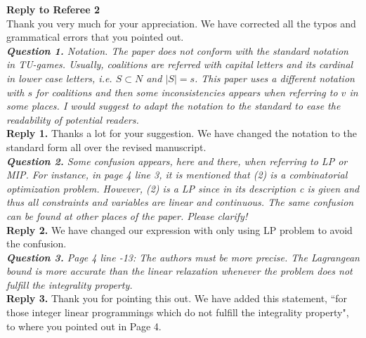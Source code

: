\documentclass[11pt]{article}
\begin{document}
\noindent \textbf{\large Reply to Referee 2}
\\[3mm]
Thank you very much for your appreciation.
We have corrected all the typos and grammatical errors that you pointed out.
~\\[4mm]
%
%
%
\noindent \textit{\textbf{Question 1.}
Notation. The paper does not conform with the standard notation in TU-games. Usually, coalitions are referred with capital letters and its cardinal in lower case letters, i.e. $S \subset N$ and $|S| = s$. This paper uses a different notation with $s$ for coalitions and then some inconsistencies appears when referring to $v$ in some places. I would suggest to adapt the notation to the standard to ease the readability of potential readers.}
~\\[2mm]
\noindent \textbf{Reply 1.}
Thanks a lot for your suggestion.
We have changed the notation to the standard form all over the revised manuscript.
\\[4mm]
%
%
%
\noindent \textit{\textbf{Question 2.}
Some confusion appears, here and there, when referring to LP or MIP.
For instance, in page 4 line 3, it is mentioned that (2) is a combinatorial optimization problem. However, (2) is a LP since in its description c is
given and thus all constraints and variables are linear and continuous.
The same confusion can be found at other places of the paper. Please clarify!}
\\[2mm]
\noindent \textbf{Reply 2.}
We have changed our expression with only using LP problem to avoid the confusion.
\\[4mm]
%
%
%
\noindent \textit{\textbf{Question 3.}
Page 4 line -13: The authors must be more precise. The Lagrangean
bound is more accurate than the linear relaxation whenever the problem does not fulfill the integrality property.
}
\\[2mm]
\noindent \textbf{Reply 3.}
Thank you for pointing this out.
We have added this statement, ``for those integer linear programmings which do not fulfill the integrality property", to where you pointed out in Page 4.
\\[4mm]
\end{document}

